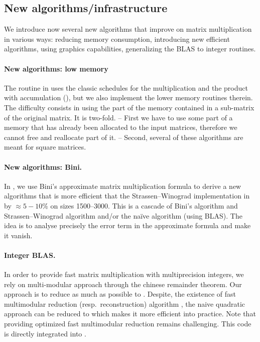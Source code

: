 \subsection{New algorithms/infrastructure}
%
We introduce now several new algorithms that improve on matrix multiplication
in various ways: reducing memory consumption, introducing new efficient
algorithms, using graphics capabilities, generalizing the BLAS to integer
routines.
%
\paragraph{New algorithms: low memory}
%
The routine \fgemm in \fflas uses the classic schedules for the multiplication and
the product with accumulation (\cf \cite{Boyer:2009:sched}), but we also
implement the lower memory routines therein.
%
%
The difficulty consists in using the part of the memory contained in a
sub-matrix of the original matrix. It is two-fold. -- First we have to use some
part of a memory that has already been allocated to the input matrices,
therefore we cannot free and reallocate part of it. -- Second, several of these
algorithms are meant for square matrices.
%
%
%
\paragraph{New algorithms: Bini.}
%
In \cite{BD:2014:Bini}, we use Bini's approximate matrix multiplication formula
to derive a new algorithms that is more efficient that the Strassen--Winograd
implementation in \fgemm by $\approx 5-10\%$ on sizes \num{1500}--\num{3000}.
This is a cascade of Bini's algorithm and Strassen--Winograd algorithm and/or
the naïve algorithm (using BLAS). The idea is to analyse precisely the error
term in the approximate formula and make it vanish.
%
\paragraph{Integer BLAS.}
%
In order to provide fast matrix multiplication with multiprecision integers, we
rely on multi-modular approach through the chinese remainder theorem. Our
approach is to reduce as much as possible to \fgemm. Despite, the existence of
fast multimodular reduction (resp.\ reconstruction) algorithm
\cite{VonzurGathen:1999:MCA}, the naive quadratic approach can be reduced to
\fgemm which makes it more efficient into practice.  Note that providing
optimized fast multimodular reduction remains challenging. This code is
directly integrated  into \fflas.

